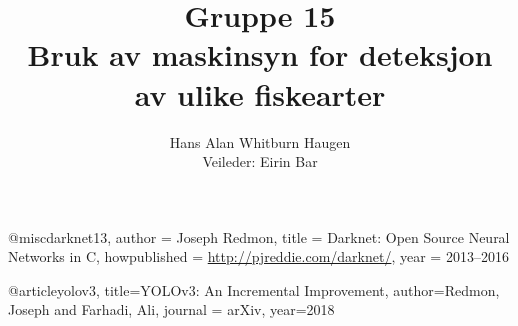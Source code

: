 \documentclass[11ot]{article}
\title{Gruppe 15\\Bruk av maskinsyn for deteksjon av ulike fiskearter}
\author{Hans Alan Whitburn Haugen\\Veileder: Eirin Bar}
\begin{document}

\newpage

\newpage

\tableofcontents
\clearpage
{}
\setcounter{page}{1}




@misc{darknet13,
  author =   {Joseph Redmon},
  title =    {Darknet: Open Source Neural Networks in C},
  howpublished = {\url{http://pjreddie.com/darknet/}},
  year = {2013--2016}
}

@article{yolov3,
  title={YOLOv3: An Incremental Improvement},
  author={Redmon, Joseph and Farhadi, Ali},
  journal = {arXiv},
  year={2018}
}
\end{document}
